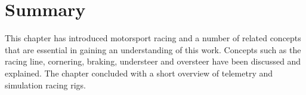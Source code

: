 \section{Summary}
This chapter has introduced motorsport racing and a number of related concepts that are essential in gaining an understanding of this work. Concepts such as the racing line, cornering, braking, understeer and oversteer have been discussed and explained. The chapter concluded with a short overview of telemetry and simulation racing rigs.